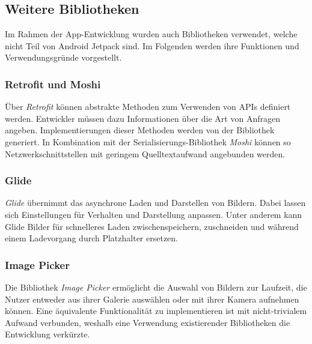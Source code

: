 \documentclass[a4paper, 11pt]{article}
\begin{document}
\subsection{Weitere Bibliotheken}
\label{subsec:app:bibs}

Im Rahmen der App-Entwicklung wurden auch Bibliotheken verwendet, welche nicht Teil von Android Jetpack sind.
Im Folgenden werden ihre Funktionen und Verwendungsgründe vorgestellt.

\subsubsection{Retrofit und Moshi}
\label{subsubsec:app:bibs:retrofitmoshi}

Über \textit{Retrofit} können abstrakte Methoden zum Verwenden von APIs definiert werden.
Entwickler müssen dazu Informationen über die Art von Anfragen angeben.
Implementierungen dieser Methoden werden von der Bibliothek generiert.
In Kombination mit der Serialisierungs-Bibliothek \textit{Moshi} können so Netzwerkschnittstellen mit geringem Quelltextaufwand angebunden werden.

\subsubsection{Glide}
\label{subsubsec:app:bibs:glide}

\textit{Glide} übernimmt das asynchrone Laden und Darstellen von Bildern.
Dabei lassen sich Einstellungen für Verhalten und Darstellung anpassen.
Unter anderem kann Glide Bilder für schnelleres Laden zwischenspeichern, zuschneiden und während einem Ladevorgang durch Platzhalter ersetzen.

\subsubsection{Image Picker}
\label{subsubsec:app:bibs:imagepicker}

Die Bibliothek \textit{Image Picker} ermöglicht die Auswahl von Bildern zur Laufzeit, die Nutzer entweder aus ihrer Galerie auswählen oder mit ihrer Kamera aufnehmen können.
Eine äquivalente Funktionalität zu implementieren ist mit nicht-trivialem Aufwand verbunden, weshalb eine Verwendung existierender Bibliotheken die Entwicklung verkürzte.
\end{document}
